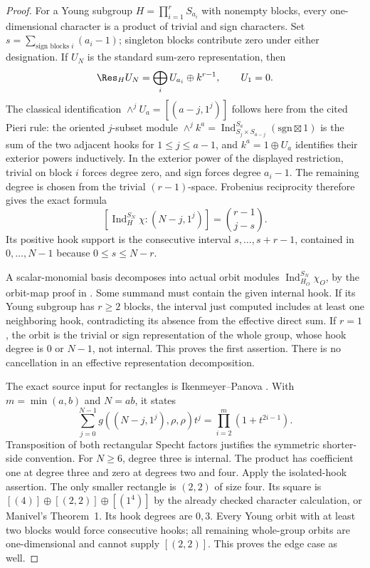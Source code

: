 \begin{proof}
For a Young subgroup $H=\prod_{i=1}^r S_{a_i}$ with nonempty blocks,
every one-dimensional character is a product of trivial and sign
characters. Set $s=\sum_{\text{sign blocks }i}(a_i-1)$; singleton
blocks contribute zero under either designation. If $U_N$ is the
standard sum-zero representation, then
\[
 \Res_H U_N=\bigoplus_i U_{a_i}\oplus k^{r-1},\qquad U_1=0.
\]
The classical identification $\wedge^jU_a=[(a-j,1^j)]$ follows here
from the cited Pieri rule: the oriented $j$-subset module
$\wedge^j k^a=\operatorname{Ind}_{S_j\times S_{a-j}}^{S_a}
(\mathrm{sgn}\boxtimes1)$ is the sum of the two adjacent hooks for $1\le j\le a-1$,
and $k^a=1\oplus U_a$ identifies their exterior powers inductively.
In the exterior power of the displayed restriction, trivial on block
$i$ forces degree zero, and sign forces degree $a_i-1$. The remaining
degree is chosen from the trivial $(r-1)$-space. Frobenius reciprocity
therefore gives the exact formula
\[
 [\operatorname{Ind}_H^{S_N}\chi:(N-j,1^j)]
       =\binom{r-1}{j-s}.
\]
Its positive hook support is the consecutive interval
$s,\ldots,s+r-1$, contained in $0,\ldots,N-1$ because
$0\le s\le N-r$.

A scalar-monomial basis decomposes into actual orbit modules
$\operatorname{Ind}_{H_O}^{S_N}\chi_O$, by the orbit-map proof in
. Some summand must contain the given internal hook. If its
Young subgroup has $r\ge2$ blocks, the interval just computed includes
at least one neighboring hook, contradicting its absence from the
effective direct sum. If $r=1$, the orbit is the trivial or sign
representation of the whole group, whose hook degree is $0$ or
$N-1$, not internal. This proves the first assertion. There is no
cancellation in an effective representation decomposition.

The exact source input for rectangles is Ikenmeyer--Panova
\cite[Proposition~6.4, pp.~15--16]{IP}. With $m=\min(a,b)$ and $N=ab$,
it states
\begin{equation}\label{eq:recthookproduct}
 \sum_{j=0}^{N-1}g((N-j,1^j),\rho,\rho)t^j
       =\prod_{i=2}^{m}(1+t^{2i-1}).
\end{equation}
Transposition of both rectangular Specht factors justifies the
symmetric shorter-side convention. For $N\ge6$, degree three is
internal. The product has coefficient one at degree three and zero
at degrees two and four. Apply the isolated-hook assertion.
The only smaller rectangle is $(2,2)$ of size four. Its square is
$[(4)]\oplus[(2,2)]\oplus[(1^4)]$ by the already checked character
calculation, or Manivel's Theorem~1. Its hook degrees are $0,3$.
Every Young orbit with at least two blocks would force consecutive
hooks; all remaining whole-group orbits are one-dimensional and
cannot supply $[(2,2)]$. This proves the edge case as well.
\end{proof}

